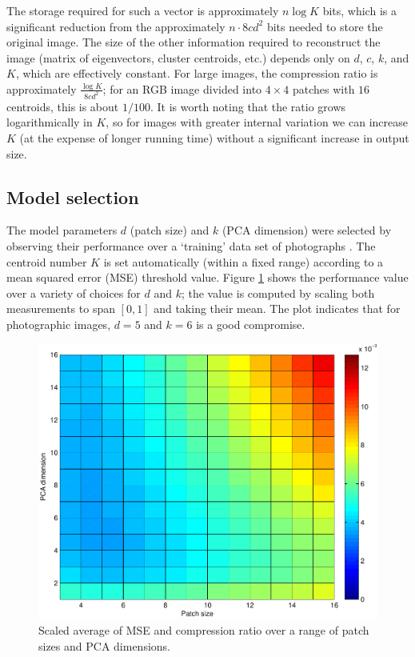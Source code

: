 The storage required for such a vector is approximately $n \log K$ bits, which is a significant reduction from the approximately $n \cdot 8cd^2$ bits needed to store the original image. The size of the other information required to reconstruct the image (matrix of eigenvectors, cluster centroids, etc.) depends only on $d$, $c$, $k$, and $K$, which are effectively constant. For large images, the compression ratio is approximately $\frac{\log K}{8cd^2}$; for an RGB image divided into $4 \times 4$ patches with $16$ centroids, this is about $1/100$. It is worth noting that the ratio grows logarithmically in $K$, so for images with greater internal variation we can increase $K$ (at the expense of longer running time) without a significant increase in output size.

\subsection{Model selection}
\label{modelsel}
The model parameters $d$ (patch size) and $k$ (PCA dimension) were selected by observing their performance over a `training' data set of photographs \cite{MartinFTM01}. The centroid number $K$ is set automatically (within a fixed range) according to a mean squared error (MSE) threshold value. Figure \ref{training_scavg} shows the performance value over a variety of choices for $d$ and $k$; the value is computed by scaling both measurements to span $[0,1]$ and taking their mean. The plot indicates that for photographic images, $d = 5$ and $k = 6$ is a good compromise.

\begin{figure}[tbp]
    \includegraphics[width=\columnwidth]{training_scaled_avg_4-64-crop}
    \caption{Scaled average of MSE and compression ratio over a range of patch sizes and PCA dimensions.}
    \label{training_scavg}
\end{figure}

